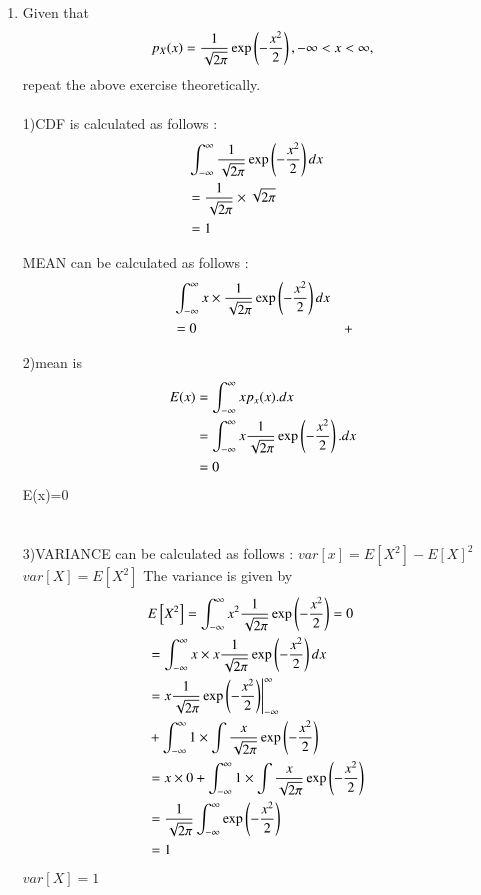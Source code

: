 \documentclass[journal,12pt,twocolumn]{IEEEtran}
\renewcommand\thesection{\arabic{section}}
\begin{document}
\begin{enumerate}[label=\thesection.\arabic*
,ref=\thesection.\theenumi]
\item Given that 
\begin{align}
p_{X}(x) = \frac{1}{\sqrt{2\pi}}\exp\left(-\frac{x^2}{2}\right), -\infty < x < \infty,
\end{align}
repeat the above exercise theoretically.\\
\solution\\ 
1)CDF is calculated as follows :
\begin{align}
 & \int_{-\infty}^{\infty} \frac{1}{\sqrt{2\pi}}\exp\left(-\frac{x^2}{2}\right) dx & \\
    & = \frac{1}{\sqrt{2\pi}} \times \sqrt{2\pi} & \\
     & = 1 &
\end{align}

MEAN can be calculated as follows :
\begin{align}
   & \int_{-\infty}^{\infty} x \times \frac{1}{\sqrt{2\pi}}\exp\left(-\frac{x^2}{2}\right) dx& \\ 
   & = 0 &+
\end{align}
  
  2)mean is 
  \begin{align}
      E(x)&=\int_{-\infty}^{\infty} xp_x(x).dx\\
      &=\int_{-\infty}^{\infty} x\frac{1}{\sqrt{2\pi}}\exp\left(-\frac{x^2}{2}\right).dx\\
      &=0\\
  \end{align}
 E(x)=0\\ \\ \\
 
 3)VARIANCE can be calculated as follows :
 $var[x]=E[X^2]-E[X]^2$\\
 $var[X]=E[X^2]$
The variance is given by
		\begin{align}
		&	E{}\left[X^2\right] = \int_{-\infty}^{\infty}x^2\frac{1}{\sqrt{2\pi}}\exp{\left(-\frac{x^2}{2}\right)} = 0 & \\
		& = \int_{-\infty}^{\infty} x \times x \frac{1}{\sqrt{2\pi}}\exp\left(-\frac{x^2}{2}\right) dx & \\
		& = x\frac{1}{\sqrt{2\pi}}\exp\left(-\frac{x^2}{2}\right)\Biggr|_{-\infty}^{\infty}& \\
 &+\int_{-\infty}^{\infty}1\times\int  \frac{x}{\sqrt{2\pi}}\exp\left(-\frac{x^2}{2}\right)&\\
 & = x \times 0+\int_{-\infty}^{\infty}1 \times \int  \frac{x}{\sqrt{2\pi}}\exp\left(-\frac{x^2}{2}\right) &\\
		&  = \frac{1}{\sqrt{2\pi}}\int_{-\infty}^{\infty} \exp\left(-\frac{x^2}{2}\right) & \\
		& =1\\
		\end{align}
\therefore $var[X]=1$\\
\end{enumerate}
\end{document}
